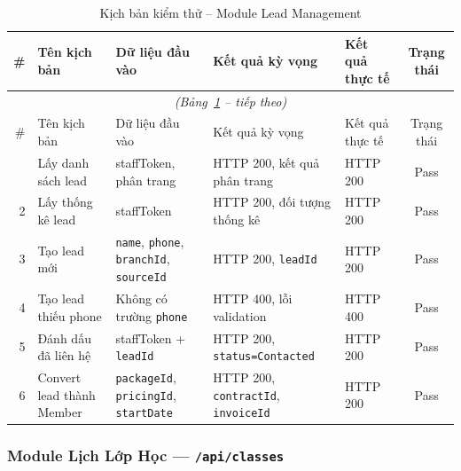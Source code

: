 \begin{longtable}{r p{3.2cm} p{2.8cm} p{2.8cm} p{2cm} c}
\caption{Kịch bản kiểm thử – Module Lead Management}
\label{tab:tc-lead} \\
\toprule
\# & Tên kịch bản & Dữ liệu đầu vào & Kết quả kỳ vọng & Kết quả thực tế & Trạng thái \\
\midrule
\endfirsthead
\multicolumn{6}{c}{\textit{(Bảng~\ref{tab:tc-lead} – tiếp theo)}} \\ \toprule
\# & Tên kịch bản & Dữ liệu đầu vào & Kết quả kỳ vọng & Kết quả thực tế & Trạng thái \\ \midrule
\endhead \midrule \endfoot \bottomrule \endlastfoot
1 & Lấy danh sách lead      & staffToken, phân trang            & HTTP 200, kết quả phân trang        & HTTP 200 & Pass \\
2 & Lấy thống kê lead       & staffToken                        & HTTP 200, đối tượng thống kê        & HTTP 200 & Pass \\
3 & Tạo lead mới            & \texttt{name}, \texttt{phone}, \texttt{branchId}, \texttt{sourceId} & HTTP 200, \texttt{leadId} & HTTP 200 & Pass \\
4 & Tạo lead thiếu phone    & Không có trường \texttt{phone}    & HTTP 400, lỗi validation            & HTTP 400 & Pass \\
5 & Đánh dấu đã liên hệ    & staffToken + \texttt{leadId}      & HTTP 200, \texttt{status=Contacted} & HTTP 200 & Pass \\
6 & Convert lead thành Member & \texttt{packageId}, \texttt{pricingId}, \texttt{startDate} & HTTP 200, \texttt{contractId}, \texttt{invoiceId} & HTTP 200 & Pass \\
\end{longtable}

\subsubsection{Module Lịch Lớp Học — \texttt{/api/classes}}


